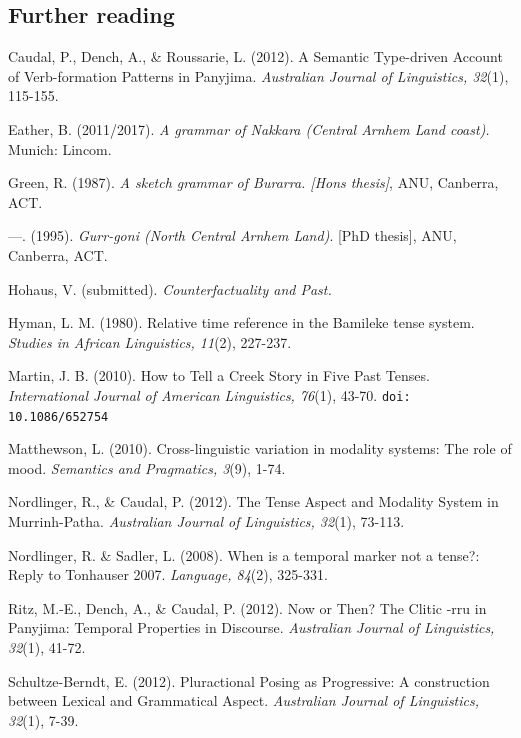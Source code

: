 \documentclass[12pt]{article}
\begin{document}
\subsection{Further reading}\begin{hangparas}{3em}{1}


Caudal, P., Dench, A., \& Roussarie, L. (2012). A Semantic Type-driven Account of Verb-formation Patterns in Panyjima.\textit{ Australian Journal of Linguistics, 32}(1), 115-155. 

Eather, B. (2011/2017).\textit{ A grammar of Nakkara (Central Arnhem Land coast).} Munich: Lincom.


Green, R. (1987).\textit{ A sketch grammar of Burarra. [Hons thesis]}, ANU, Canberra, ACT.   


---. (1995). \textit{Gurr-goni (North Central Arnhem Land)}. [PhD thesis], ANU, Canberra, ACT.   



Hohaus, V. (submitted). \textit{Counterfactuality and Past. }

Hyman, L. M. (1980). Relative time reference in the Bamileke tense system. \textit{Studies in African Linguistics, 11}(2), 227-237. 



Martin, J. B. (2010). How to Tell a Creek Story in Five Past Tenses. \textit{International Journal of American Linguistics, 76}(1), 43-70. \texttt{doi: 10.1086/652754}





Matthewson, L. (2010). Cross-linguistic variation in modality systems: The role of mood. \textit{Semantics and Pragmatics, 3}(9), 1-74. 


Nordlinger, R., \& Caudal, P. (2012). The Tense Aspect and Modality System in Murrinh-Patha. \textit{Australian Journal of Linguistics, 32}(1), 73-113. 

Nordlinger, R. \& Sadler, L. (2008). When is a temporal marker not a tense?: Reply to Tonhauser 2007. \textit{Language, 84}(2), 325-331. 



Ritz, M.-E., Dench, A., \& Caudal, P. (2012). Now or Then? The Clitic -rru in Panyjima: Temporal Properties in Discourse.\textit{ Australian Journal of Linguistics, 32}(1), 41-72. 


Schultze-Berndt, E. (2012). Pluractional Posing as Progressive: A construction between Lexical and Grammatical Aspect.\textit{ Australian Journal of Linguistics, 32}(1), 7-39. 


\end{hangparas}
\end{document}
